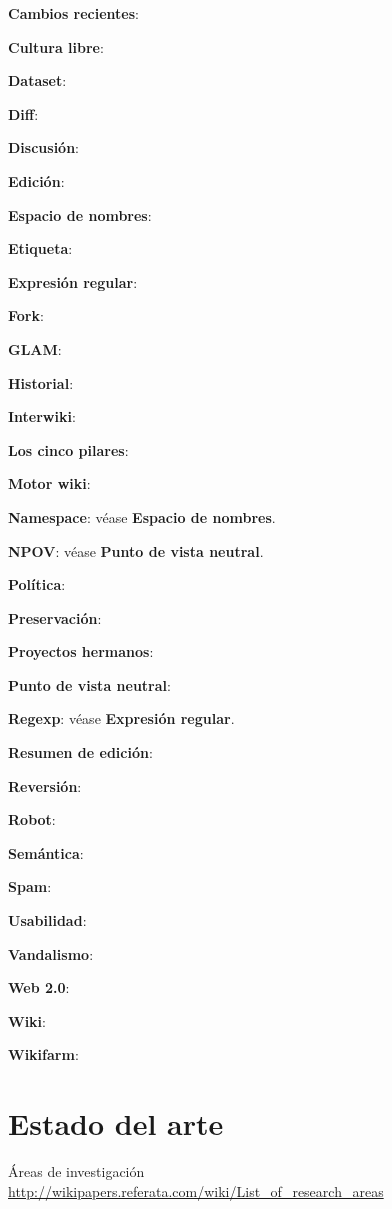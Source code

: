 \documentclass[11pt,onecolumn]{article}
\begin{document}
\textbf{Cambios recientes}:

\textbf{Cultura libre}:


\textbf{Dataset}:

\textbf{Diff}:


\textbf{Discusión}:

\textbf{Edición}:

\textbf{Espacio de nombres}:

\textbf{Etiqueta}:

\textbf{Expresión regular}:

\textbf{Fork}:


\textbf{GLAM}:

\textbf{Historial}:

\textbf{Interwiki}:

\textbf{Los cinco pilares}:


\textbf{Motor wiki}:

\textbf{Namespace}: véase \textbf{Espacio de nombres}.

\textbf{NPOV}: véase \textbf{Punto de vista neutral}.

\textbf{Política}:

\textbf{Preservación}:

\textbf{Proyectos hermanos}:

\textbf{Punto de vista neutral}:

\textbf{Regexp}: véase \textbf{Expresión regular}.

\textbf{Resumen de edición}:


\textbf{Reversión}:

\textbf{Robot}:


\textbf{Semántica}:

\textbf{Spam}:


\textbf{Usabilidad}:

\textbf{Vandalismo}:

\textbf{Web 2.0}:

\textbf{Wiki}:

\textbf{Wikifarm}:


\section{Estado del arte}

Áreas de investigación \href{http://wikipapers.referata.com/wiki/List_of_research_areas}{http://wikipapers.referata.com/wiki/List\_of\_research\_areas}

~\citep{okoli2009}
~\citep{martin2011}
~\citep{voss2005}
~\citep{okoli2009b}
~\citep{ayers2006}
~\citep{okoli2012}
~\citep{jullien2012}
~\citep{nielsen2011}
\end{document}
